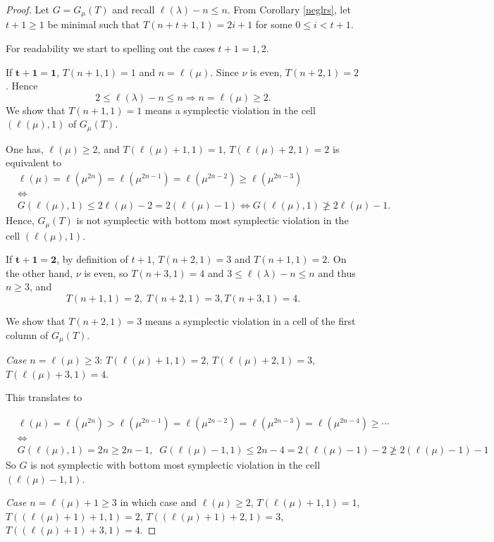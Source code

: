 \documentclass[10pt,a4paper]{amsart}
\begin{document}
\begin{proof} Let $ G=G_\mu(T)$ and recall $\ell(\lambda)-n\le n$. From Corollary \ref{neglrs}, let $t+1\ge 1$ be  minimal such that $T(n+t+1,1)=2i+1$ for some  $0\le i<t+1$.

For readability we start to spelling out the cases $t+1=1,2$.

If $\mathbf{t+1=1}$, $T(n+1,1)=1$  and $n=\ell(\mu)$. Since $\nu$ is even,  $T(n+2,1)=2$. Hence $$2\le \ell(\lambda)-n\le n\Rightarrow n=\ell(\mu)\ge 2.$$ We show that $T(n+1,1)=1$ means a symplectic violation in the cell $(\ell(\mu),1)$ of $G_\mu(T)$.

One has, $\ell(\mu)\ge 2$, and $T(\ell(\mu)+1,1)=1$,   $T(\ell(\mu)+2,1)=2$ is equivalent to
\begin{align}&\ell(\mu)=\ell(\mu^{2n})=\ell(\mu^{2n-1})=\ell(\mu^{2n-2})\ge\ell(\mu^{2n-3})\\
&\Leftrightarrow \\
&G(\ell(\mu),1)\le 2\ell(\mu)-2=2(\ell(\mu)-1)\Leftrightarrow G(\ell(\mu),1)\ngeq 2\ell(\mu)-1.
\end{align}
Hence,  $G_\mu(T)$ is not symplectic with bottom most symplectic violation in the cell $(\ell(\mu),1)$.


If $\mathbf{t+1=2}$,  by definition of $t+1$, $T(n+2,1)=3$ and $T(n+1,1)=2$. On the other hand, $\nu$ is even,  so $T(n+3,1)=4$ and $3\le \ell(\lambda)-n\le n$ and thus $n\ge 3$, and
$$T(n+1,1)=2, \;T(n+2,1)=3, T(n+3,1)=4.$$

We show that $T(n+2,1)=3$ means a symplectic violation in a cell of the first column of $G_\mu(T)$.

\medskip
\emph{Case $n=\ell(\mu)\ge 3$}:   $T(\ell(\mu)+1,1)=2$, $T(\ell(\mu)+2,1)=3$,
$T(\ell(\mu)+3,1)=4$.

This translates to

\begin{align*}&\ell(\mu)=\ell(\mu^{2n})>\ell(\mu^{2n-1})=\ell(\mu^{2n-2})=\ell(\mu^{2n-3})=\ell(\mu^{2n-4})\ge\cdots \\
&\Leftrightarrow \\
&G(\ell(\mu),1)=2n\ge 2n-1,\;\;
G(\ell(\mu)-1,1)\le 2n-4=2(\ell(\mu)-1)-2 \ngeq 2(\ell(\mu)-1)-1
\end{align*}
So
$G$ is not symplectic with bottom most symplectic violation in the cell $(\ell(\mu)-1,1)$.

\medskip

\emph{Case  $n=\ell(\mu)+1\ge 3$} in which case and $\ell(\mu)\ge 2$, $T(\ell(\mu)+1,1)=1$, $T((\ell(\mu)+1)+1,1)=2$,
$T((\ell(\mu)+1)+2,1)=3$, $T((\ell(\mu)+1)+3,1)=4$.


\end{proof}
\end{document}
